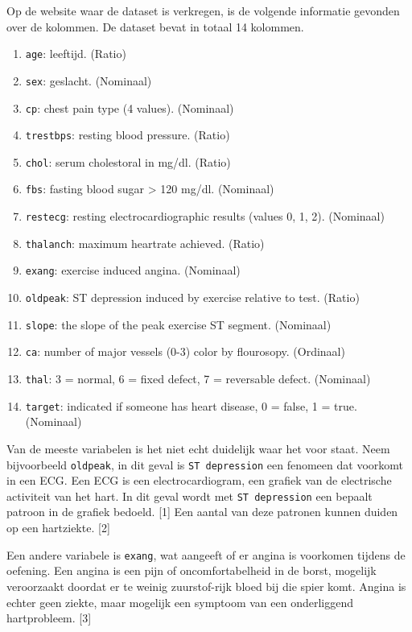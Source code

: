 \documentclass[11pt]{article}
\providecommand{\tightlist}{%
      \setlength{\itemsep}{0pt}\setlength{\parskip}{0pt}}
\begin{document}
Op de website waar de dataset is verkregen, is de volgende informatie
gevonden over de kolommen. De dataset bevat in totaal 14 kolommen.

\begin{enumerate}
\def\labelenumi{\arabic{enumi}.}
\tightlist
\item
  \texttt{age}: leeftijd. (Ratio)
\item
  \texttt{sex}: geslacht. (Nominaal)
\item
  \texttt{cp}: chest pain type (4 values). (Nominaal)
\item
  \texttt{trestbps}: resting blood pressure. (Ratio)
\item
  \texttt{chol}: serum cholestoral in mg/dl. (Ratio)
\item
  \texttt{fbs}: fasting blood sugar \textgreater{} 120 mg/dl. (Nominaal)
\item
  \texttt{restecg}: resting electrocardiographic results (values 0, 1,
  2). (Nominaal)
\item
  \texttt{thalanch}: maximum heartrate achieved. (Ratio)
\item
  \texttt{exang}: exercise induced angina. (Nominaal)
\item
  \texttt{oldpeak}: ST depression induced by exercise relative to test.
  (Ratio)
\item
  \texttt{slope}: the slope of the peak exercise ST segment. (Nominaal)
\item
  \texttt{ca}: number of major vessels (0-3) color by flourosopy.
  (Ordinaal)
\item
  \texttt{thal}: 3 = normal, 6 = fixed defect, 7 = reversable defect.
  (Nominaal)
\item
  \texttt{target}: indicated if someone has heart disease, 0 = false, 1
  = true. (Nominaal)
\end{enumerate}

Van de meeste variabelen is het niet echt duidelijk waar het voor staat.
Neem bijvoorbeeld \texttt{oldpeak}, in dit geval is
\texttt{ST\ depression} een fenomeen dat voorkomt in een ECG. Een ECG is
een electrocardiogram, een grafiek van de electrische activiteit van het
hart. In dit geval wordt met \texttt{ST\ depression} een bepaalt patroon
in de grafiek bedoeld. {[}1{]} Een aantal van deze patronen kunnen
duiden op een hartziekte. {[}2{]}

Een andere variabele is \texttt{exang}, wat aangeeft of er angina is
voorkomen tijdens de oefening. Een angina is een pijn of
oncomfortabelheid in de borst, mogelijk veroorzaakt doordat er te weinig
zuurstof-rijk bloed bij die spier komt. Angina is echter geen ziekte,
maar mogelijk een symptoom van een onderliggend hartprobleem. {[}3{]}
\end{document}
